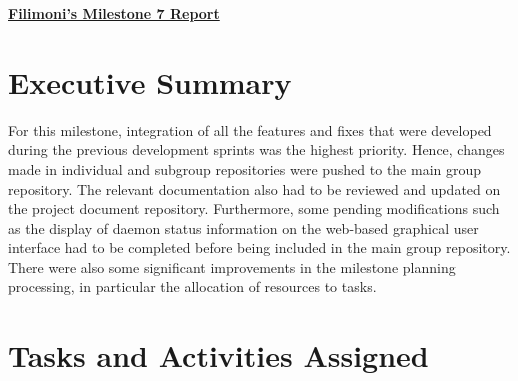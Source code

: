 \begin{center}
{\large\textbf{\underline{{Filimoni's Milestone 7 Report}}}}
\end{center}

\section*{Executive Summary}

For this milestone, integration of all the features and fixes that were developed during the previous development sprints was the highest priority. Hence, changes made in individual and subgroup repositories were pushed to the main group repository. The relevant documentation also had to be reviewed and updated on the project document repository. Furthermore, some pending modifications such as the display of daemon status information on the web-based graphical user interface had to be completed before being included in the main group repository. There were also some significant improvements in the milestone planning processing, in particular the allocation of resources to tasks.

\section*{Tasks and Activities Assigned}

